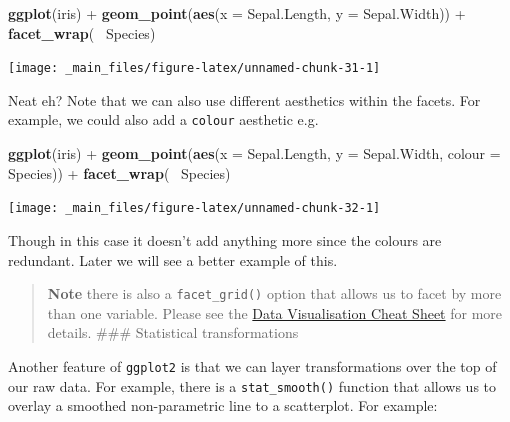 \documentclass[]{book}
\newenvironment{Shaded}{\begin{snugshade}}{\end{snugshade}}
\newcommand{\KeywordTok}[1]{\textcolor[rgb]{0.13,0.29,0.53}{\textbf{{#1}}}}
\newcommand{\DataTypeTok}[1]{\textcolor[rgb]{0.13,0.29,0.53}{{#1}}}
\newcommand{\StringTok}[1]{\textcolor[rgb]{0.31,0.60,0.02}{{#1}}}
\newcommand{\NormalTok}[1]{{#1}}
\theoremstyle{definition}
\theoremstyle{definition}
\theoremstyle{definition}
\theoremstyle{remark}
\begin{document}
\begin{Shaded}
\begin{Highlighting}[]
\KeywordTok{ggplot}\NormalTok{(iris) +}
\StringTok{    }\KeywordTok{geom_point}\NormalTok{(}\KeywordTok{aes}\NormalTok{(}\DataTypeTok{x =} \NormalTok{Sepal.Length, }\DataTypeTok{y =} \NormalTok{Sepal.Width)) +}
\StringTok{    }\KeywordTok{facet_wrap}\NormalTok{(~}\StringTok{ }\NormalTok{Species)}
\end{Highlighting}
\end{Shaded}

\begin{center}\texttt{[image: \_main\_files/figure-latex/unnamed-chunk-31-1]} \end{center}

Neat eh? Note that we can also use different aesthetics within the
facets. For example, we could also add a \texttt{colour} aesthetic e.g.

\begin{Shaded}
\begin{Highlighting}[]
\KeywordTok{ggplot}\NormalTok{(iris) +}
\StringTok{    }\KeywordTok{geom_point}\NormalTok{(}\KeywordTok{aes}\NormalTok{(}\DataTypeTok{x =} \NormalTok{Sepal.Length, }\DataTypeTok{y =} \NormalTok{Sepal.Width, }\DataTypeTok{colour =} \NormalTok{Species)) +}
\StringTok{    }\KeywordTok{facet_wrap}\NormalTok{(~}\StringTok{ }\NormalTok{Species)}
\end{Highlighting}
\end{Shaded}

\begin{center}\texttt{[image: \_main\_files/figure-latex/unnamed-chunk-32-1]} \end{center}

Though in this case it doesn't add anything more since the colours are
redundant. Later we will see a better example of this.

\begin{quote}
\textbf{Note} there is also a \texttt{facet\_grid()} option that allows
us to facet by more than one variable. Please see the
\href{https://github.com/rstudio/cheatsheets/raw/master/data-visualization-2.1.pdf}{Data
Visualisation Cheat Sheet} for more details. \#\#\# Statistical
transformations
\end{quote}

Another feature of \texttt{ggplot2} is that we can layer transformations
over the top of our raw data. For example, there is a
\texttt{stat\_smooth()} function that allows us to overlay a smoothed
non-parametric line to a scatterplot. For example:
\end{document}
